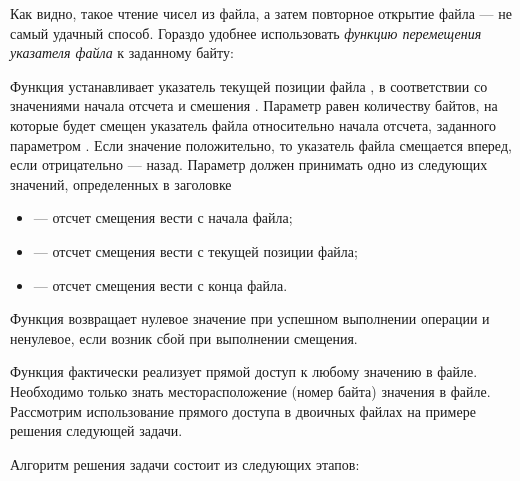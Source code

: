 Как видно, такое чтение чисел из файла, а затем повторное открытие файла --- не самый удачный способ. Гораздо удобнее
использовать \emph{функцию перемещения указателя файла} к заданному байту:


Функция устанавливает указатель текущей позиции файла , в соответствии со значениями начала отсчета
 и смешения . Параметр  равен количеству
байтов, на которые будет смещен указатель файла относительно начала отсчета, заданного параметром
. Если значение  положительно, то указатель файла смещается вперед,
если отрицательно --- назад. Параметр  должен принимать одно из следующих значений, 
определенных в заголовке 
\begin{itemize}
\item[]  --- отсчет смещения  вести с начала файла;
\item[]  --- отсчет смещения  вести с текущей позиции файла;
\item[]  --- отсчет смещения  вести с конца файла.
\end{itemize}
Функция возвращает нулевое значение при успешном выполнении операции и ненулевое, если возник сбой при выполнении
смещения.

Функция  фактически реализует прямой доступ к любому значению в файле. Необходимо только знать
месторасположение (номер байта) значения в файле. Рассмотрим использование прямого доступа в двоичных файлах на примере
решения следующей задачи.


Алгоритм решения задачи состоит из следующих этапов:

